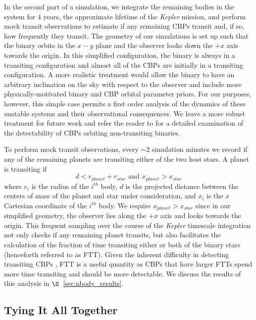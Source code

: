 In the second part of a simulation, we integrate the remaining bodies in the system for $4$ years, the approximate lifetime of the \textit{Kepler} mission, and perform mock transit observations to estimate if any remaining CBPs transit and, if so, how frequently they transit.  The geometry of our simulations is set up such that the binary orbits in the $x-y$ plane and the observer looks down the $+x$ axis towards the origin.  In this simplified configuration, the binary is always in a transiting configuration and almost all of the CBPs are initially in a transiting configuration.  A more realistic treatment would allow the binary to have an arbitrary inclination on the sky with respect to the observer and include more physically-motivated binary and CBP orbital parameter priors.  For our purposes, however, this simple case permits a first order analysis of the dynamics of these unstable systems and their observational consequences. We leave a more robust treatment for future work and refer the reader to \citet{Martin2014} for a detailed examination of the detectability of CBPs orbiting non-transiting binaries.

To perform mock transit observations, every ${\sim}2$ simulation minutes we record if any of the remaining planets are transiting either of the two host stars.  A planet is transiting if
\begin{equation} \label{eqn:transit}
d < r_{planet} + r_{star} \text{ and } x_{planet} > x_{star}
\end{equation}
where $r_{i}$ is the radius of the $i^{th}$ body, $d$ is the projected distance between the centers of mass of the planet and star under consideration, and $x_{i}$ is the $x$ Cartesian coordinate of the $i^{th}$ body.  We require $x_{planet} > x_{star}$ since in our simplified geometry, the observer lies along the $+x$ axis and looks towards the origin.  This frequent sampling over the course of the \textit{Kepler} timescale integration not only checks if any remaining planet transits, but also facilitates the calculation of the fraction of time transiting either or both of the binary stars (henceforth referred to as FTT).  Given the inherent difficulty in detecting transiting CBPs \citep[e.g.][]{Welsh2014,Winn2015}, FTT is a useful quantity as CBPs that have larger FTTs spend more time transiting and should be more detectable.  We discuss the results of this analysis in $\S$~\ref{sec:nbody_results}.

\subsection{Tying It All Together}

